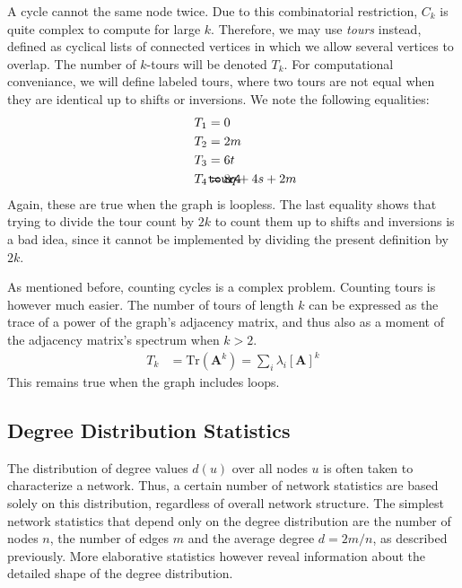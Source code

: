 \documentclass{article}
\def\mathnote#1{%
  \tag*{\rlap{\hspace\marginparsep\smash{\parbox[t]{\marginparwidth}{#1}}}}
}
\begin{document}
A cycle cannot the same node twice.  Due to this combinatorial
restriction, $C_k$ is quite complex to compute for large $k$.
Therefore, we may use \emph{tours} instead, defined as cyclical lists of
connected vertices in which we allow several vertices to overlap.  The
number of $k$-tours will be denoted $T_k$.  For computational
conveniance, we will define labeled tours, where two tours are not equal
when they are identical up to shifts or inversions.  
We note the following equalities: 
\begin{align}
  T_1 &= 0 \nonumber \\
  T_2 &= 2m \nonumber \\
  T_3 &= 6t \nonumber \\
  \mathnote{\texttt{tour4}}
  T_4 &= 8q + 4s + 2m 
\end{align}
Again, these are true when the graph is loopless.  The last equality
shows that trying to divide the tour count by $2k$ to count them up to
shifts and inversions is a bad idea, since it cannot be implemented by
dividing the present definition by $2k$. 

As mentioned before, counting cycles is a complex problem.  Counting
tours is however much easier.  The number of tours of length $k$ can be
expressed as the trace of a power of the graph's adjacency matrix, and
thus also as a moment of the adjacency matrix's spectrum when $k > 2$.  
\begin{align*}
  T_k &= \mathrm{Tr}(\mathbf A^k) = \sum_i \lambda_i[\mathbf A]^k
\end{align*}
This remains true when the graph includes loops.  

\subsection{Degree Distribution Statistics}
The distribution of degree values $d(u)$ over all nodes $u$ is often
taken to characterize a network.  Thus, a certain number of network
statistics are based solely on this distribution, regardless of overall
network structure.  
The simplest network statistics that depend only on the degree
distribution are the number of nodes $n$, the number of edges $m$ and
the average degree $d=2m/n$, as described previously.  More elaborative
statistics however reveal information about the detailed shape of the
degree distribution. 
\end{document}
